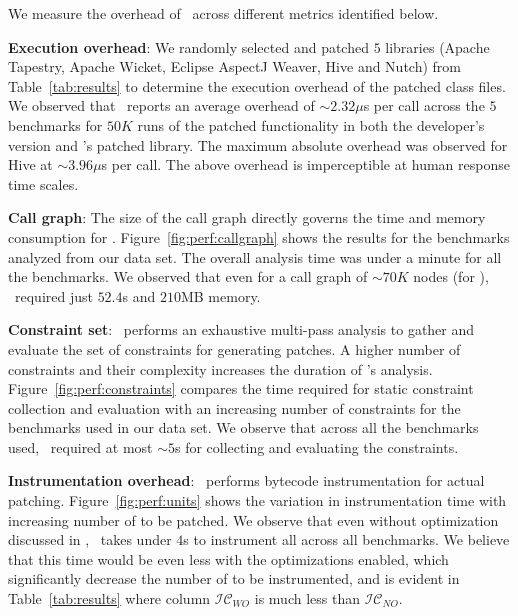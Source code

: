 We measure the overhead of \tool\ across different metrics identified below.

\begin{mylist}

 \item \textbf{Execution overhead}: We randomly selected and patched $5$
libraries (Apache Tapestry, Apache Wicket, Eclipse AspectJ Weaver, Hive and
Nutch) from Table~\ref{tab:results} to determine the execution overhead of the
patched class files. We observed that \tool\ reports an average overhead of
$\sim$$2.32\mu$s per call across the $5$ benchmarks for $50K$ runs of the
patched functionality in both the developer's version and \tool's patched
library. The maximum absolute overhead was observed for Hive at $\sim$$3.96\mu$s
per call. The above overhead is imperceptible at human response time scales.

 \item \textbf{Call graph}: The size of the call graph directly governs the time
and memory consumption for \tool. Figure~\ref{fig:perf:callgraph} shows the
results for the benchmarks analyzed from our data set. The overall analysis
time was under a minute for all the benchmarks. We observed that even for a call
graph of $\sim$$70K$ nodes (for ), \tool\ required just $52.4$s
and $210$MB memory.

 \item \textbf{Constraint set}: \tool\ performs an exhaustive multi-pass
analysis to gather and evaluate the set of constraints for generating patches. A
higher number of constraints and their complexity increases the duration of
\tool's analysis. Figure~\ref{fig:perf:constraints} compares the time required
for static constraint collection and evaluation with an increasing number of
constraints for the benchmarks used in our data set. We observe that across
all the benchmarks used, \tool\ required at most $\sim$$5$s for collecting and
evaluating the constraints.

\item \textbf{Instrumentation overhead}: \tool\ performs bytecode
instrumentation for actual patching. Figure~\ref{fig:perf:units} shows the
variation in instrumentation time with increasing number of  to be
patched. We observe that even without optimization discussed in
, \tool\ takes under $4$s to instrument all
 across all benchmarks. We believe that this time would be even
less with the optimizations enabled, which significantly decrease the number of
 to be instrumented, and is evident in Table~\ref{tab:results} where
column $\mathcal{IC}_{WO}$ is much less than $\mathcal{IC}_{NO}$.

\end{mylist}

